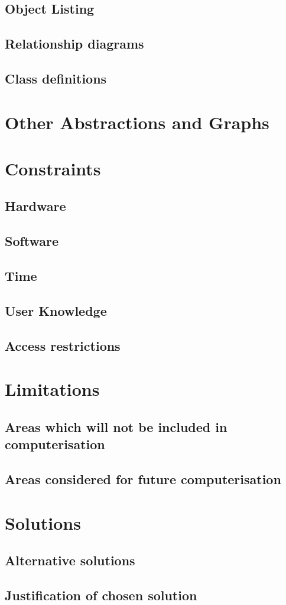 \subsection{Object Listing}

\subsection{Relationship diagrams}

\subsection{Class definitions}

\section{Other Abstractions and Graphs}

\section{Constraints}

\subsection{Hardware}

\subsection{Software}

\subsection{Time}

\subsection{User Knowledge}

\subsection{Access restrictions}

\section{Limitations}

\subsection{Areas which will not be included in computerisation}
\subsection{Areas considered for future computerisation}

\section{Solutions}

\subsection{Alternative solutions}

\subsection{Justification of chosen solution}
